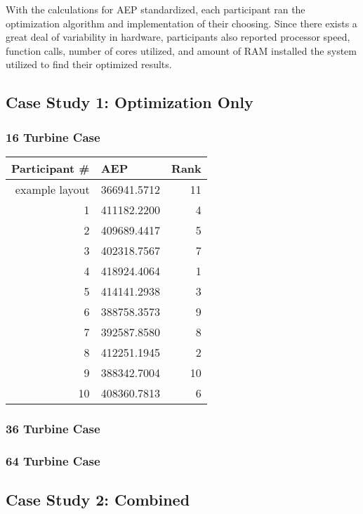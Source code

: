 With the calculations for AEP standardized, each participant ran the optimization algorithm and implementation of their choosing.
Since there exists a great deal of variability in hardware, participants also reported processor speed, function calls, number of cores utilized, and amount of RAM installed the system utilized to find their optimized results.


\subsection{Case Study 1: Optimization Only}

\subsubsection{16 Turbine Case}

	\begin{center}
		\begin{tabular}{r l r}
			\hline
			Participant \# & AEP & Rank \\
			\hline
			example layout & 366941.5712 & 11 \\
			1 & 411182.2200 & 4 \\
			2 & 409689.4417 & 5 \\
			3 & 402318.7567 & 7 \\
			4 & 418924.4064 & 1 \\
			5 & 414141.2938 & 3 \\
			6 & 388758.3573 & 9 \\
			7 & 392587.8580 & 8 \\
			8 & 412251.1945 & 2 \\
			9 & 388342.7004 & 10 \\
			10 & 408360.7813 & 6 \\
			\hline
		\end{tabular}
	\end{center}



\subsubsection{36 Turbine Case}

\subsubsection{64 Turbine Case}


\subsection{Case Study 2: Combined}

